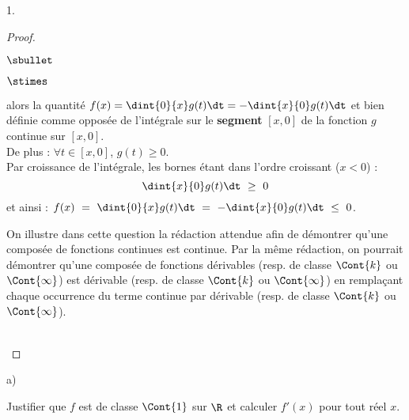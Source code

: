 \begin{noliste}{1.}
\begin{proof}
\begin{noliste}{$\sbullet$}
\begin{noliste}{$\stimes$}
      \item {} alors la quantité $f(x) =
        \dint{0}{x} g(t) \dt = - \dint{x}{0} g(t) \dt$ et bien définie
        comme opposée de l'intégrale sur le {\bf segment} $[x, 0]$ de
        la fonction $g$ continue sur $[x, 0]$.\\
        De plus : $\forall t \in [x, 0]$, $g(t) \geq 0$.\\[.2cm]
        Par croissance de l'intégrale, les bornes étant dans l'ordre
        croissant ($x < 0$) :
        \[
        \dint{x}{0} g(t) \dt \ \geq \ 0
        \]
        et ainsi : $f(x) \ = \ \dint{0}{x} g(t) \dt \ = \ -
        \dint{x}{0} g(t) \dt \ \leq \ 0$. %
      \end{noliste}      
    \end{noliste}
    \begin{remarkL}{.97}%
      On illustre dans cette question la rédaction attendue afin de
      démontrer qu'une composée de fonctions continues est
      continue. Par la même rédaction, on pourrait démontrer qu'une
      composée de fonctions dérivables (resp. de classe $\Cont{k}$ ou
      $\Cont{\infty}$) est dérivable (resp. de classe $\Cont{k}$ ou
      $\Cont{\infty}$) en remplaçant chaque occurrence du terme \og
      continue \fg{} par dérivable (resp. de classe $\Cont{k}$ ou
      $\Cont{\infty}$).
    \end{remarkL}~\\[-1.3cm]
  \end{proof}


  \newpage

  
  \begin{noliste}{a)}
    \setlength{\itemsep}{2mm} %
    \setcounter{enumii}{1}
  \item Justifier que $f$ est de classe $\Cont{1}$ sur $\R$ et
    calculer $f'(x)$ pour tout réel $x$.
    

\end{noliste}
\end{noliste}
